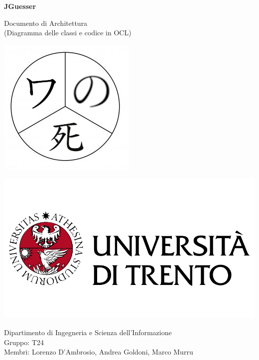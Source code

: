 \documentclass[11pt]{article}
\begin{document}
\begin{titlepage}
		\begin{center}
		    \Huge
			\textbf{JGuesser}
			
			\LARGE
			\vspace{0.85cm}
			Documento di Architettura\\
			(Diagramma delle classi e codice in OCL)
			\vspace{0.5cm}
			
			\includegraphics[scale=2.5]{images/logo_progetto_se-t24.png}
			
			\vfill
			
		    \includegraphics[scale=0.200]{images/logo_unitn.png}
			
			\Large
			Dipartimento di Ingegneria e Scienza dell’Informazione \\
			Gruppo: T24 \\
			Membri: Lorenzo D'Ambrosio, Andrea Goldoni, Marco Murru
				
			\vspace{1.5cm}
    		
		\end{center}
	\end{titlepage}

\tableofcontents




\end{document}
